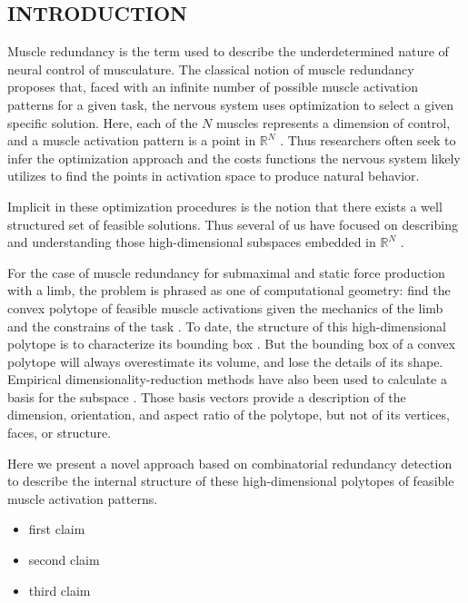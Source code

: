 \begin{introduction}
\section{INTRODUCTION}

Muscle redundancy is the term used to describe the underdetermined nature of neural control of musculature.
The classical notion of muscle redundancy  proposes that, faced with an infinite number of possible muscle activation patterns for a given task, the nervous system uses optimization to select a given specific solution.
Here, each of the $N$ muscles represents a dimension of control, and a muscle activation pattern is a point in $\mathbb{R}^N$ \cite{Valero-Cuevas1998Large}.
Thus researchers often seek to infer the optimization approach and the costs functions the nervous system likely utilizes to find the points in activation space to produce natural behavior\cite{Chao1978Graphical,Prilutsky2000Muscle,scott2004optimal,todorov2002optimal,crowninshield1981physiologically,higginson2005simulated}. 


Implicit in these optimization procedures is the notion that there exists a well structured set of feasible solutions. Thus several of us have focused on describing and understanding those high-dimensional subspaces  embedded in $\mathbb{R}^N$ \cite{kutch2011muscle,kutch2012challenges,sohn2013cat_bounding_box,Valero-Cuevas1998Large,Valero-Cuevas2015high-dimensional}.

For the case of muscle redundancy for submaximal and static force production with a limb,  the problem is phrased as one of computational geometry: find the convex polytope of feasible muscle activations given the mechanics of the limb and the constrains of the task \cite{avis1992Pivoting,Valero-Cuevas1998Large,Valero-Cuevas2009mathematical,Valero-Cuevas2015high-dimensional}.  To date, the structure of this high-dimensional polytope is to characterize its bounding box \cite{kutch2011muscle,sohn2013cat_bounding_box,Valero-Cuevas2015high-dimensional}.  But the bounding box of a convex polytope will always overestimate its volume, and lose the details of its shape.  Empirical dimensionality-reduction methods have also been used to calculate a basis for the subspace \cite{Clewley2008Estimating,davella2005shared,krishnamoorthy2003muscle}. Those basis vectors  provide a description of the dimension, orientation, and aspect ratio of the polytope, but not of its vertices, faces, or structure.

Here we present a novel approach based on combinatorial redundancy detection \cite{fukuda2014combinatorial} to describe the internal structure of these high-dimensional polytopes of feasible muscle activation patterns.
\begin{itemize}

\item first claim
\item second claim
\item third claim

\end{itemize}

\end{introduction}